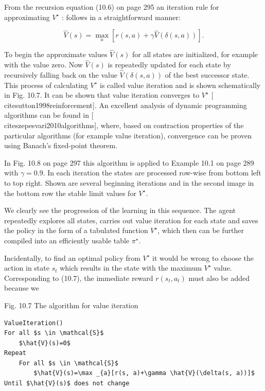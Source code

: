 \documentclass[10pt]{book}
\begin{document}
From the recursion equation (10.6) on page 295 an iteration rule for approximating $V^{\star}$ : follows in a straightforward manner:


\begin{equation*}
\hat{V}(s)=\max _{a}[r(s, a)+\gamma \hat{V}(\delta(s, a))] . \tag{10.8}
\end{equation*}


To begin the approximate values $\hat{V}(s)$ for all states are initialized, for example with the value zero. Now $\hat{V}(s)$ is repeatedly updated for each state by recursively falling back on the value $\hat{V}(\delta(s, a))$ of the best successor state. This process of calculating $V^{\star}$ is called value iteration and is shown schematically in Fig. 10.7. It can be shown that value iteration converges to $V^{\star}$ [\\cite{sutton1998reinforcement}]. An excellent analysis of dynamic programming algorithms can be found in [\\cite{szepesvari2010algorithms}], where, based on contraction properties of the particular algorithms (for example value iteration), convergence can be proven using Banach's fixed-point theorem.

In Fig. 10.8 on page 297 this algorithm is applied to Example 10.1 on page 289 with $\gamma=0.9$. In each iteration the states are processed row-wise from bottom left to top right. Shown are several beginning iterations and in the second image in the bottom row the stable limit values for $V^{\star}$.

We clearly see the progression of the learning in this sequence. The agent repeatedly explores all states, carries out value iteration for each state and saves the policy in the form of a tabulated function $V^{\star}$, which then can be further compiled into an efficiently usable table $\pi^{\star}$.

Incidentally, to find an optimal policy from $V^{\star}$ it would be wrong to choose the action in state $s_{t}$ which results in the state with the maximum $V^{\star}$ value. Corresponding to (10.7), the immediate reward $r\left(s_{t}, a_{t}\right)$ must also be added because we

Fig. 10.7 The algorithm for value iteration

\begin{verbatim}
ValueIteration()
For all $s \in \mathcal{S}$
    $\hat{V}(s)=0$
Repeat
    For all $s \in \mathcal{S}$
        $\hat{V}(s)=\max _{a}[r(s, a)+\gamma \hat{V}(\delta(s, a))]$
Until $\hat{V}(s)$ does not change
\end{verbatim}
\end{document}
